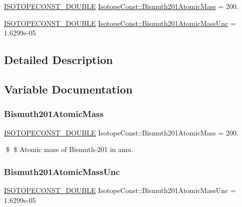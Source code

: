 \begin{DoxyCompactItemize}
\item 
\mbox{\hyperlink{group___isotope_const-_macros_ga8f45a7272ce02c0b4c65c44636ed719a}{I\+S\+O\+T\+O\+P\+E\+C\+O\+N\+S\+T\+\_\+\+D\+O\+U\+B\+LE}} \mbox{\hyperlink{group___isotope_const-_bismuth-_bi201_gaadde7ce9b1bb9ef4cd2dd694182ccada}{Isotope\+Const\+::\+Bismuth201\+Atomic\+Mass}} = 200.
\item 
\mbox{\hyperlink{group___isotope_const-_macros_ga8f45a7272ce02c0b4c65c44636ed719a}{I\+S\+O\+T\+O\+P\+E\+C\+O\+N\+S\+T\+\_\+\+D\+O\+U\+B\+LE}} \mbox{\hyperlink{group___isotope_const-_bismuth-_bi201_ga5f00b78ba463e083462e65e08e147fcb}{Isotope\+Const\+::\+Bismuth201\+Atomic\+Mass\+Unc}} = 1.\+6299e-\/05
\end{DoxyCompactItemize}


\subsection{Detailed Description}


\subsection{Variable Documentation}
\mbox{\label{group___isotope_const-_bismuth-_bi201_gaadde7ce9b1bb9ef4cd2dd694182ccada}} 
\subsubsection{\texorpdfstring{Bismuth201\+Atomic\+Mass}{Bismuth201AtomicMass}}
{\footnotesize\ttfamily \mbox{\hyperlink{group___isotope_const-_macros_ga8f45a7272ce02c0b4c65c44636ed719a}{I\+S\+O\+T\+O\+P\+E\+C\+O\+N\+S\+T\+\_\+\+D\+O\+U\+B\+LE}} Isotope\+Const\+::\+Bismuth201\+Atomic\+Mass = 200.}

\$ \$ Atomic mass of Bismuth-\/201 in amu. \mbox{\label{group___isotope_const-_bismuth-_bi201_ga5f00b78ba463e083462e65e08e147fcb}} 
\subsubsection{\texorpdfstring{Bismuth201\+Atomic\+Mass\+Unc}{Bismuth201AtomicMassUnc}}
{\footnotesize\ttfamily \mbox{\hyperlink{group___isotope_const-_macros_ga8f45a7272ce02c0b4c65c44636ed719a}{I\+S\+O\+T\+O\+P\+E\+C\+O\+N\+S\+T\+\_\+\+D\+O\+U\+B\+LE}} Isotope\+Const\+::\+Bismuth201\+Atomic\+Mass\+Unc = 1.\+6299e-\/05}

